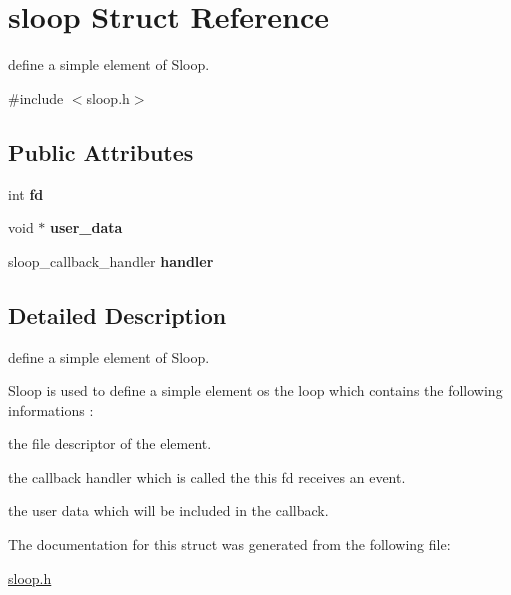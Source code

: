 \hypertarget{structsloop}{\section{sloop \-Struct \-Reference}
\label{structsloop}
}


define a simple element of \-Sloop.  




{\ttfamily \#include $<$sloop.\-h$>$}

\subsection*{\-Public \-Attributes}
\begin{DoxyCompactItemize}
\item 
\hypertarget{structsloop_adc156046ac0fc04a7ae653d6797b849f}{int {\bfseries fd}}\label{structsloop_adc156046ac0fc04a7ae653d6797b849f}

\item 
\hypertarget{structsloop_a98f70a486c76c79badfb4ad71b362fc4}{void $\ast$ {\bfseries user\-\_\-data}}\label{structsloop_a98f70a486c76c79badfb4ad71b362fc4}

\item 
\hypertarget{structsloop_a5007b651619937c129958ead4f403223}{sloop\-\_\-callback\-\_\-handler {\bfseries handler}}\label{structsloop_a5007b651619937c129958ead4f403223}

\end{DoxyCompactItemize}


\subsection{\-Detailed \-Description}
define a simple element of \-Sloop. 

\-Sloop is used to define a simple element os the loop which contains the following informations \-:
\begin{DoxyItemize}
\item the file descriptor of the element.
\item the callback handler which is called the this fd receives an event.
\item the user data which will be included in the callback. 
\end{DoxyItemize}

\-The documentation for this struct was generated from the following file\-:\begin{DoxyCompactItemize}
\item 
\hyperlink{sloop_8h}{sloop.\-h}\end{DoxyCompactItemize}
